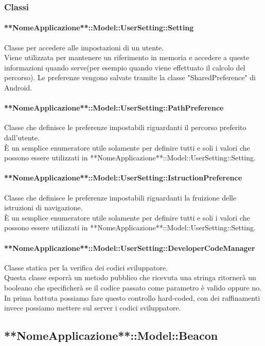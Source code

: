 \documentclass[../SpecificaTecnica.tex]{subfiles}
\begin{document}
		\subsubsection{Classi}
			\paragraph{**NomeApplicazione**::Model::UserSetting::Setting}
				Classe per accedere alle impostazioni di un utente. \\
				Viene utilizzata per mantenere un riferimento in memoria e accedere a queste informazioni quando serve(per esempio quando viene effettuato il calcolo del percorso). Le preferenze vengono salvate tramite la classe "SharedPreference" di Android.
			\paragraph{**NomeApplicazione**::Model::UserSetting::PathPreference}
				Classe che definisce le preferenze impostabili riguardanti il percorso preferito dall'utente. \\
				È un semplice enumeratore utile solamente per definire tutti e soli i valori che possono essere utilizzati in **NomeApplicazione**::Model::UserSetting::Setting.
			\paragraph{**NomeApplicazione**::Model::UserSetting::IstructionPreference}
				Classe che definisce le preferenze impostabili riguardanti la fruizione delle istruzioni di navigazione. \\
				È un semplice enumeratore utile solamente per definire tutti e soli i valori che possono essere utilizzati in **NomeApplicazione**::Model::UserSetting::Setting.
			\paragraph{**NomeApplicazione**::Model::UserSetting::DeveloperCodeManager}
				Classe statica per la verifica dei codici sviluppatore. \\
				Questa classe esporrà un metodo pubblico che ricevuta una stringa ritornerà un booleano che specificherà se il codice passato come parametro è valido oppure no. In prima battuta possiamo fare questo controllo hard-coded, con dei raffinamenti invece possiamo mettere sul server i codici sviluppatore.
	\newpage
	\subsection{**NomeApplicazione**::Model::Beacon}
\end{document}
